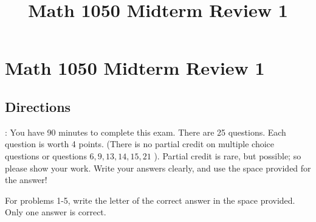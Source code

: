\documentclass{ximera}
\title{Math 1050 Midterm Review 1}
\begin{document}
\section*{Math 1050 Midterm Review 1}

\subsection*{Directions}: You have 90 minutes to complete this exam. There are 25 questions. Each question is worth 4 points. (There is no partial credit on multiple choice questions or questions $6,9,13,14,15,21$ ). Partial credit is rare, but possible; so please show your work. Write your answers clearly, and use the space provided for the answer!

For problems 1-5, write the letter of the correct answer in the space provided. Only one answer is correct.
\end{document}
